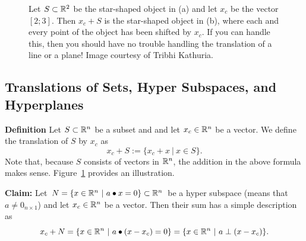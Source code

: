 \begin{figure}[htb!]
    \centering
    \caption[]{Let $S\subset \mathbb R^2$ be the star-shaped object in (a) and let $x_c$ be the vector $[2; 3]$. Then $x_c + S$ is the star-shaped object in (b), where each and every point of the object has been shifted by $x_c$. If you can handle this, then you should have no trouble handling the translation of a line or a plane! Image courtesy of Tribhi Kathuria.}
    \label{fig:TranslationStar}
    \end{figure}

\subsection{Translations of Sets, Hyper Subspaces, and Hyperplanes}

\textbf{Definition} Let $S\subset \mathbb R^n$ be a subset and and let $x_c\in \mathbb R^n$ be a vector. We define the translation of $S$ by $x_c$ as
$$ x_c + S:= \{x_c + x~|~ x\in S \}.$$
Note that, because $S$ consists of vectors in $\mathbb R^n$, the addition in the above formula makes sense. Figure~\ref{fig:TranslationStar} provides an illustration. 


\vspace*{0.2cm}
    
\textbf{Claim:} Let $N = \{ x\in \mathbb R^n~|~ a \bullet x = 0\} \subset \mathbb R^n$ be a hyper subspace (means that $a \neq 0_{n \times 1}$) and let $x_c\in \mathbb R^n$ be a vector. Then their sum has a simple description as
\begin{equation}
    \label{eq:DefHyperPlaneEq}
   x_c + N =\{ x\in \mathbb R^n~|~ a \bullet(x-x_c)=0\} = \{ x\in \mathbb R^n~|~ a \perp (x-x_c)\}.
\end{equation}

